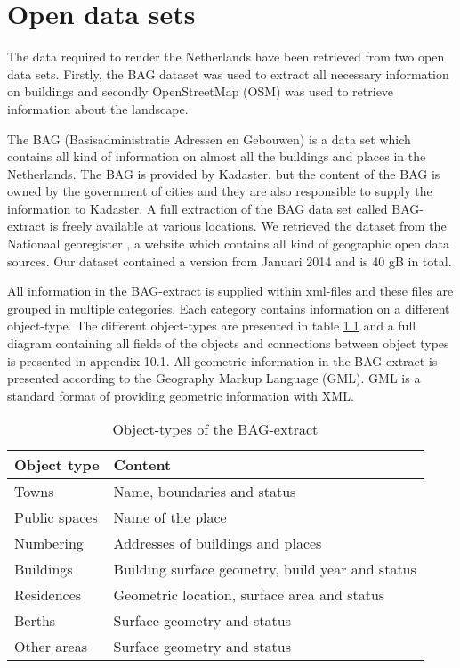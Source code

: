 \chapter{Open data sets}
\label{chap:OpenDataSets}
The data required to render the Netherlands have been retrieved from two open data sets. Firstly, the BAG dataset \cite{BAG14} was used to extract all necessary information on buildings and secondly OpenStreetMap (OSM) \cite{OSM14} was used to retrieve information about the landscape.

The BAG (Basisadministratie Adressen en Gebouwen) is a data set which contains all kind of information on almost all the buildings and places in the Netherlands. The BAG is provided by Kadaster, but the content of the BAG is owned by the government of cities and they are also responsible to supply the information to Kadaster. A full extraction of the BAG data set called BAG-extract is freely available at various locations. We retrieved the dataset from the Nationaal georegister \cite{NG14}, a website which contains all kind of geographic open data sources. Our dataset contained a version from Januari 2014 and is 40 gB in total.

All information in the BAG-extract is supplied within xml-files and these files are grouped in multiple categories. Each category contains information on a different object-type. The different object-types are presented in table \ref{Table:ObjectTypesBAG} and a full diagram containing all fields of the objects and connections between object types is presented in appendix 10.1. All geometric information in the BAG-extract is presented according to the Geography Markup Language (GML). GML is a standard format of providing geometric information with XML.

\begin{table}
    \begin{tabular}{l|l}
      \textbf{Object type} & \textbf{Content}     \\ \hline
      Towns & Name, boundaries and status  \\ \hline
      Public spaces & Name of the place  \\ \hline
      Numbering & Addresses of buildings and places  \\ \hline
      Buildings & Building surface geometry, build year and status  \\ \hline
      Residences & Geometric location, surface area and status  \\ \hline
      Berths & Surface geometry and status  \\ \hline
      Other areas & Surface geometry and status \\
    \end{tabular}
    \caption{Object-types of the BAG-extract}
    \label{Table:ObjectTypesBAG}
\end{table}

